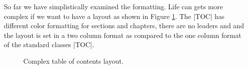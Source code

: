 

So far we have simplistically examined the formatting. Life can gets more complex if we want to have a layout as shown in Figure \ref{fig:toc}. The |TOC| has different color formatting for sections and chapters, there are no leaders and and the layout is set in a two column format as compared to the one column format of the standard classes |TOC|.

\begin{figure}[tp]
\centering
{}
\caption{Complex table of contents layout.}
\label{fig:toc}
\end{figure}


\begin{teXXX}
\renewcommand\l@chapter[3]{%
  \ifnum \c@tocdepth >\m@ne
    \addpenalty{-\@highpenalty}%
    \vskip 1.0em \@plus\p@
    \setlength\@tempdima{1.5em}%
    \begingroup
      \parindent \z@ \rightskip \@pnumwidth
      \parfillskip -\@pnumwidth
      \leavevmode
      \advance\leftskip\@tempdima
      \hskip -\leftskip
      \vbox{\raggedright#1\vskip1pt%
      \hrule width3cm height0.4pt}\par
      #2
      \penalty\@highpenalty
    \endgroup
  \fi}
\end{teXXX}

